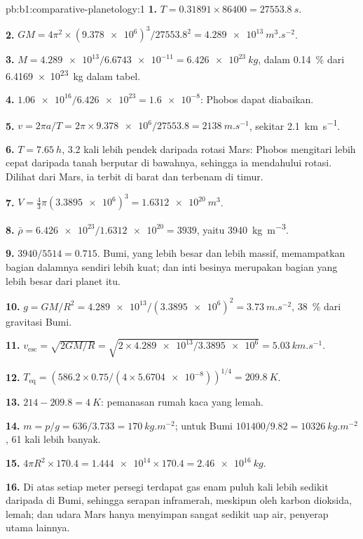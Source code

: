 \begin{solution}{pb:b1:comparative-planetology:1}
\textbf{1.} $T = 0.31891\times86400 = \qty{27553.8}{s}$.

\textbf{2.} $GM = 4\pi^2\times(\num{9.378e6})^3/\num{27553.8}^2 =
\qty{4.289e13}{m^3.s^{-2}}$.

\textbf{3.} $M = \num{4.289e13}/\num{6.6743e-11} = \qty{6.426e23}{kg}$,
dalam \qty{0.14}{\percent} dari \qty{6.4169e23}{kg} dalam tabel.

\textbf{4.} $\num{1.06e16}/\num{6.426e23} = \num{1.6e-8}$: Phobos dapat diabaikan.

\textbf{5.} $v = 2\pi a/T = 2\pi\times\num{9.378e6}/27553.8 =
\qty{2138}{m.s^{-1}}$, sekitar \qty{2.1}{km.s^{-1}}.

\textbf{6.} $T = \qty{7.65}{h}$, 3.2 kali lebih pendek daripada rotasi
Mars: Phobos mengitari lebih cepat daripada tanah berputar di bawahnya, sehingga ia mendahului rotasi. Dilihat dari Mars, ia terbit di barat dan terbenam di timur.

\textbf{7.} $V = \tfrac43\pi(\num{3.3895e6})^3 = \qty{1.6312e20}{m^3}$.

\textbf{8.} $\bar\rho = \num{6.426e23}/\num{1.6312e20} = 3939$, yaitu
\qty{3940}{kg.m^{-3}}.

\textbf{9.} $3940/5514 = 0.715$. Bumi, yang lebih besar dan lebih massif, memampatkan bagian dalamnya sendiri lebih kuat; dan inti besinya merupakan bagian yang lebih besar dari planet itu.

\textbf{10.} $g = GM/R^2 = \num{4.289e13}/(\num{3.3895e6})^2 =
\qty{3.73}{m.s^{-2}}$, \qty{38}{\percent} dari gravitasi Bumi.

\textbf{11.} $v_\mathrm{esc} = \sqrt{2GM/R} = \sqrt{2\times\num{4.289e13}/
\num{3.3895e6}} = \qty{5.03}{km.s^{-1}}$.

\textbf{12.} $T_\mathrm{eq} = (586.2\times0.75/(4\times\num{5.6704e-8}))^{1/4}
= \qty{209.8}{K}$.

\textbf{13.} $214 - 209.8 = \qty{4}{K}$: pemanasan rumah kaca yang lemah.

\textbf{14.} $m = p/g = 636/3.733 = \qty{170}{kg.m^{-2}}$; untuk Bumi
$101400/9.82 = \qty{10326}{kg.m^{-2}}$, 61 kali lebih banyak.

\textbf{15.} $4\pi R^2\times170.4 = \num{1.444e14}\times170.4 =
\qty{2.46e16}{kg}$.

\textbf{16.} Di atas setiap meter persegi terdapat gas enam puluh kali lebih sedikit daripada di Bumi, sehingga serapan inframerah, meskipun oleh karbon dioksida, lemah; dan udara Mars hanya menyimpan sangat sedikit uap air, penyerap utama lainnya.


\end{solution}

